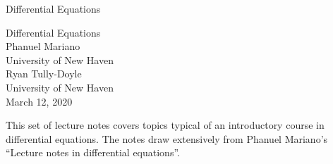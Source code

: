 \documentclass[oneside,10pt,]{book}
\numberwithin{equation}{section}
\numberwithin{equation}{section}
\begin{document}
\frontmatter
\thispagestyle{empty}
{\centering
\vspace*{0.28\textheight}
{\Huge Differential Equations}\\}
\clearpage
\thispagestyle{empty}
\null%
\clearpage
\thispagestyle{empty}
{\centering
\vspace*{0.14\textheight}
{\Huge Differential Equations}\\[3\baselineskip]
{\Large Phanuel Mariano}\\[0.5\baselineskip]
{\Large University of New Haven}\\[3\baselineskip]
{\Large Ryan Tully-Doyle}\\[0.5\baselineskip]
{\Large University of New Haven}\\[3\baselineskip]
{\Large March 12, 2020}\\}
\clearpage
\thispagestyle{empty}
\null\clearpage
This set of lecture notes covers topics typical of an introductory course in differential equations. The notes draw extensively from Phanuel Mariano's ``Lecture notes in differential equations''.%
\setcounter{tocdepth}{1}
\renewcommand*\contentsname{Contents}
\tableofcontents
\mainmatter
%
%
\typeout{************************************************}
\typeout{************************************************}
%
\end{document}
